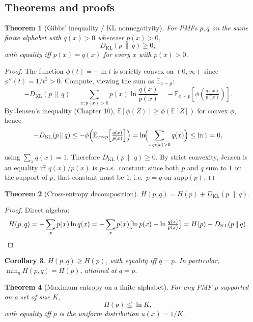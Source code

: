 \documentclass[11pt]{article}
\newtheorem{theorem}{Theorem}[section]
\newtheorem{corollary}[theorem]{Corollary}
\theoremstyle{remark}
\begin{document}
\subsection*{Theorems and proofs}

\begin{theorem}[Gibbs' inequality / KL nonnegativity]
For PMFs $p, q$ on the same finite alphabet with $q(x) > 0$ wherever $p(x) > 0$,
\[
D_{\mathrm{KL}}(p \,\|\, q) \geq 0,
\]
with equality iff $p(x) = q(x)$ for every $x$ with $p(x) > 0$.
\end{theorem}

\begin{proof}
The function $\phi(t) = -\ln t$ is strictly convex on $(0, \infty)$ since $\phi''(t) = 1/t^2 > 0$. Compute, viewing the sum as $\mathbb{E}_{x \sim p}$:
\[
-D_{\mathrm{KL}}(p \,\|\, q) = \sum_{x : p(x) > 0} p(x) \ln \frac{q(x)}{p(x)} = -\,\mathbb{E}_{x \sim p}\!\left[\phi\!\left(\tfrac{q(x)}{p(x)}\right)\right].
\]
By Jensen's inequality (Chapter 10), $\mathbb{E}[\phi(Z)] \geq \phi(\mathbb{E}[Z])$ for convex $\phi$, hence
\[
-D_{\mathrm{KL}}(p \,\|\, q) \leq -\phi\!\left(\mathbb{E}_{x \sim p}\!\left[\tfrac{q(x)}{p(x)}\right]\right) = \ln\!\Bigl(\sum_{x : p(x) > 0} q(x)\Bigr) \leq \ln 1 = 0,
\]
using $\sum_x q(x) = 1$. Therefore $D_{\mathrm{KL}}(p \,\|\, q) \geq 0$. By strict convexity, Jensen is an equality iff $q(x)/p(x)$ is $p$-a.s.\ constant; since both $p$ and $q$ sum to $1$ on the support of $p$, that constant must be $1$, i.e.\ $p = q$ on $\mathrm{supp}(p)$.
\end{proof}

\begin{theorem}[Cross-entropy decomposition]
$H(p, q) = H(p) + D_{\mathrm{KL}}(p \,\|\, q).$
\end{theorem}

\begin{proof}
Direct algebra:
\[
H(p, q) = -\sum_x p(x) \ln q(x) = -\sum_x p(x) \bigl[\ln p(x) + \ln \tfrac{q(x)}{p(x)}\bigr] = H(p) + D_{\mathrm{KL}}(p \,\|\, q). \qedhere
\]
\end{proof}

\begin{corollary}
$H(p, q) \geq H(p)$, with equality iff $q = p$. In particular, $\min_q H(p, q) = H(p)$, attained at $q = p$.
\end{corollary}

\begin{theorem}[Maximum entropy on a finite alphabet]
For any PMF $p$ supported on a set of size $K$,
\[
H(p) \leq \ln K,
\]
with equality iff $p$ is the uniform distribution $u(x) = 1/K$.
\end{theorem}
\end{document}
